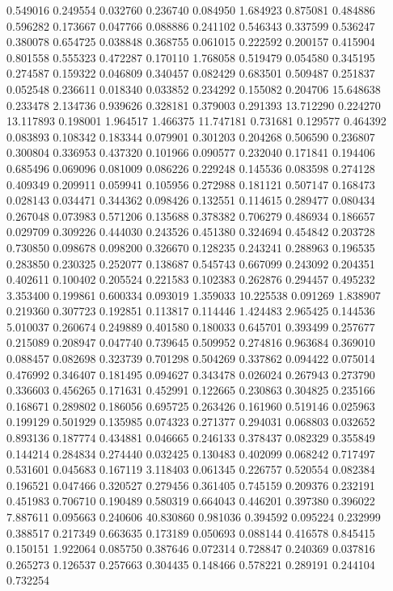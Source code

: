 0.549016
0.249554
0.032760
0.236740
0.084950
1.684923
0.875081
0.484886
0.596282
0.173667
0.047766
0.088886
0.241102
0.546343
0.337599
0.536247
0.380078
0.654725
0.038848
0.368755
0.061015
0.222592
0.200157
0.415904
0.801558
0.555323
0.472287
0.170110
1.768058
0.519479
0.054580
0.345195
0.274587
0.159322
0.046809
0.340457
0.082429
0.683501
0.509487
0.251837
0.052548
0.236611
0.018340
0.033852
0.234292
0.155082
0.204706
15.648638
0.233478
2.134736
0.939626
0.328181
0.379003
0.291393
13.712290
0.224270
13.117893
0.198001
1.964517
1.466375
11.747181
0.731681
0.129577
0.464392
0.083893
0.108342
0.183344
0.079901
0.301203
0.204268
0.506590
0.236807
0.300804
0.336953
0.437320
0.101966
0.090577
0.232040
0.171841
0.194406
0.685496
0.069096
0.081009
0.086226
0.229248
0.145536
0.083598
0.274128
0.409349
0.209911
0.059941
0.105956
0.272988
0.181121
0.507147
0.168473
0.028143
0.034471
0.344362
0.098426
0.132551
0.114615
0.289477
0.080434
0.267048
0.073983
0.571206
0.135688
0.378382
0.706279
0.486934
0.186657
0.029709
0.309226
0.444030
0.243526
0.451380
0.324694
0.454842
0.203728
0.730850
0.098678
0.098200
0.326670
0.128235
0.243241
0.288963
0.196535
0.283850
0.230325
0.252077
0.138687
0.545743
0.667099
0.243092
0.204351
0.402611
0.100402
0.205524
0.221583
0.102383
0.262876
0.294457
0.495232
3.353400
0.199861
0.600334
0.093019
1.359033
10.225538
0.091269
1.838907
0.219360
0.307723
0.192851
0.113817
0.114446
1.424483
2.965425
0.144536
5.010037
0.260674
0.249889
0.401580
0.180033
0.645701
0.393499
0.257677
0.215089
0.208947
0.047740
0.739645
0.509952
0.274816
0.963684
0.369010
0.088457
0.082698
0.323739
0.701298
0.504269
0.337862
0.094422
0.075014
0.476992
0.346407
0.181495
0.094627
0.343478
0.026024
0.267943
0.273790
0.336603
0.456265
0.171631
0.452991
0.122665
0.230863
0.304825
0.235166
0.168671
0.289802
0.186056
0.695725
0.263426
0.161960
0.519146
0.025963
0.199129
0.501929
0.135985
0.074323
0.271377
0.294031
0.068803
0.032652
0.893136
0.187774
0.434881
0.046665
0.246133
0.378437
0.082329
0.355849
0.144214
0.284834
0.274440
0.032425
0.130483
0.402099
0.068242
0.717497
0.531601
0.045683
0.167119
3.118403
0.061345
0.226757
0.520554
0.082384
0.196521
0.047466
0.320527
0.279456
0.361405
0.745159
0.209376
0.232191
0.451983
0.706710
0.190489
0.580319
0.664043
0.446201
0.397380
0.396022
7.887611
0.095663
0.240606
40.830860
0.981036
0.394592
0.095224
0.232999
0.388517
0.217349
0.663635
0.173189
0.050693
0.088144
0.416578
0.845415
0.150151
1.922064
0.085750
0.387646
0.072314
0.728847
0.240369
0.037816
0.265273
0.126537
0.257663
0.304435
0.148466
0.578221
0.289191
0.244104
0.732254
